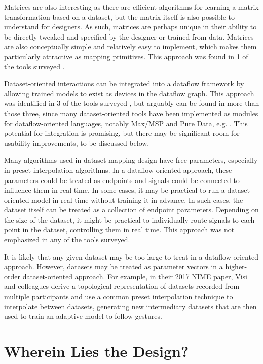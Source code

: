\documentclass[main.tex]{subfiles}
\begin{document}
Matrices are also interesting as there are efficient algorithms for learning a
matrix transformation based on a dataset, but the matrix itself is also
possible to understand for designers.  As such, matrices are perhaps unique in
their ability to be directly tweaked and specified by the designer or trained
from data.  Matrices are also conceptually simple and relatively easy to
implement, which makes them particularly attractive as mapping primitives.
This approach was found in 1 of the tools surveyed \cite{bevilacqua2005nime_mnm}.

Dataset-oriented interactions can be integrated into a dataflow framework by
allowing trained models to exist as devices in the dataflow graph.  This
approach was identified in 3 of the tools surveyed \cite{bevilacqua2005nime_mnm,
gillian2011sec, Bullock2015}, but arguably can be found in more than those
three, since many dataset-oriented tools have been implemented as modules for
dataflow-oriented languages, notably Max/MSP and Pure Data, e.g.
\cite{francoise2014nime_xmm, kiefer2014esn}.  This potential for integration is
promising, but there may be significant room for usability improvements, to be
discussed below.

Many algorithms used in dataset mapping design have free parameters, especially
in preset interpolation algorithms.  In a dataflow-oriented approach, these
parameters could be treated as endpoints and signals could be connected to
influence them in real time.  In some cases, it may be practical to run a
dataset-oriented model in real-time without training it in advance.  In such
cases, the dataset itself can be treated as a collection of endpoint
parameters.  Depending on the size of the dataset, it might be practical to
individually route signals to each point in the dataset, controlling them in
real time.  This approach was not emphasized in any of the tools surveyed.

It is likely that any given dataset may be too large to treat in a
dataflow-oriented approach.  However, datasets may be treated as parameter
vectors in a higher-order dataset-oriented approach. For example, in their 2017
NIME paper, Visi and colleagues \cite{visi2017nime} derive a topological
representation of datasets recorded from multiple participants and use a common
preset interpolation technique to interpolate between datasets, generating new
intermediary datasets that are then used to train an adaptive model to follow
gestures.

\section{Wherein Lies the Design?}\label{section:endpoints-and-connections}
\end{document}
